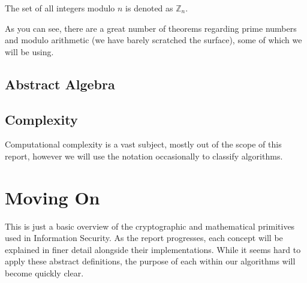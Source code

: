 \begin{mathdef}
	The set of all integers modulo $n$ is denoted as $\mathbb{Z}_n$.
\end{mathdef}

As you can see, there are a great number of theorems regarding prime numbers and modulo arithmetic (we have barely scratched the surface), some of which we will be using.

\subsection{Abstract Algebra}

\subsection{Complexity}

Computational complexity is a vast subject, mostly out of the scope of this report, however we will use the notation occasionally to classify algorithms.

\section{Moving On}

This is just a basic overview of the cryptographic and mathematical primitives used in Information Security. As the report progresses, each concept will be explained in finer detail alongside their implementations. While it seems hard to apply these abstract definitions, the purpose of each within our algorithms will become quickly clear.